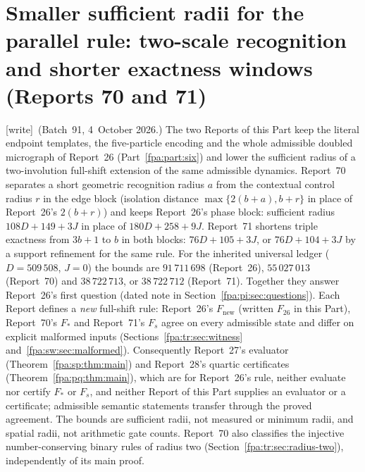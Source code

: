\documentclass[11pt,a4paper]{article}
\numberwithin{equation}{section}
\newcommand{\fpareportdate}{3 October 2026}
\newcommand{\wtag}{\textup{[write]}}
\newif\iffpaafterpart
\newcommand{\fpapart}[2]{\clearpage\global\fpaafterparttrue\part{#1}\label{#2}}
\begin{document}
\fpapart{Smaller sufficient radii for the parallel rule: two-scale recognition and shorter exactness windows (Reports 70 and 71)}{fpa:part:seven}
\renewcommand{\fpareportdate}{4 October 2026}

\wtag\ (Batch~91, 4~October 2026.) The two Reports of this Part keep the literal endpoint templates, the five-particle encoding and the whole admissible doubled micrograph of Report~26 (Part~\ref{fpa:part:six}) and lower the sufficient radius of a two-involution full-shift extension of the same admissible dynamics. Report~70 separates a short geometric recognition radius $a$ from the contextual control radius $r$ in the edge block (isolation distance $\max\{2(b+a),b+r\}$ in place of Report~26's $2(b+r)$) and keeps Report~26's phase block: sufficient radius $108D+149+3J$ in place of $180D+258+9J$. Report~71 shortens triple exactness from $3b+1$ to $b$ in both blocks: $76D+105+3J$, or $76D+104+3J$ by a support refinement for the same rule. For the inherited universal ledger ($D=509\,508$, $J=0$) the bounds are $91\,711\,698$ (Report~26), $55\,027\,013$ (Report~70) and $38\,722\,713$, or $38\,722\,712$ (Report~71). Together they answer Report~26's first question (dated note in Section~\ref{fpa:pi:sec:questions}). Each Report defines a \emph{new} full-shift rule: Report~26's $F_{\mathrm{new}}$ (written $F_{26}$ in this Part), Report~70's $F_*$ and Report~71's $F_s$ agree on every admissible state and differ on explicit malformed inputs (Sections~\ref{fpa:tr:sec:witness} and~\ref{fpa:sw:sec:malformed}). Consequently Report~27's evaluator (Theorem~\ref{fpa:sp:thm:main}) and Report~28's quartic certificates (Theorem~\ref{fpa:pq:thm:main}), which are for Report~26's rule, neither evaluate nor certify $F_*$ or $F_s$, and neither Report of this Part supplies an evaluator or a certificate; admissible semantic statements transfer through the proved agreement. The bounds are sufficient radii, not measured or minimum radii, and spatial radii, not arithmetic gate counts. Report~70 also classifies the injective number-conserving binary rules of radius two (Section~\ref{fpa:tr:sec:radius-two}), independently of its main proof.
\end{document}
